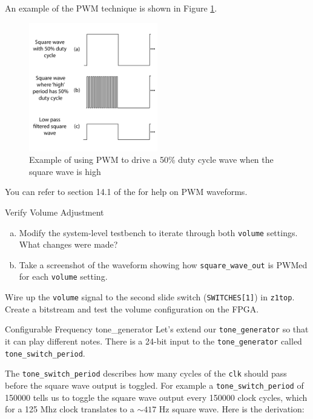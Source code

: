 \documentclass[11pt]{article}
\makeatletter
\renewcommand{\subsection}
{\@startsection {subsection}{1}{0pt}
 {-1ex}
 {0.5ex}
 {\bfseries\normalsize}}
\makeatother
\begin{document}
An example of the PWM technique is shown in Figure \ref{fig:pwm}.

\begin{figure}[h]
  \centering
  \includegraphics[width=0.5\textwidth]{figs/pwm.pdf}
  \caption{Example of using PWM to drive a 50\% duty cycle wave when the square wave is high}
  \label{fig:pwm}
\end{figure}

You can refer to section 14.1 of the \href{https://reference.digilentinc.com/reference/programmable-logic/pynq-z1/reference-manual}{\color{blue}{Pynq Reference Manual}} for help on PWM waveforms.

\begin{texexptitled}{Verify Volume Adjustment}{}
  \begin{enumerate}[a)]
    \item Modify the system-level testbench to iterate through both \verb|volume| settings. What changes were made?
    \item Take a screenshot of the waveform showing how \verb|square_wave_out| is PWMed for each \verb|volume| setting.
  \end{enumerate}
\end{texexptitled}

Wire up the \verb|volume| signal to the second slide switch (\verb|SWITCHES[1]|) in \verb|z1top|.
Create a bitstream and test the volume configuration on the FPGA.

\subsection{Configurable Frequency tone\_generator}
Let's extend our \verb|tone_generator| so that it can play different notes.
There is a 24-bit input to the \verb|tone_generator| called \verb|tone_switch_period|.

The \verb|tone_switch_period| describes how many cycles of the \verb|clk| should pass before the square wave output is toggled.
For example a \verb|tone_switch_period| of 150000 tells us to toggle the square wave output every 150000 clock cycles, which for a 125 Mhz clock translates to a $\sim 417$ Hz square wave. Here is the derivation:
\end{document}
